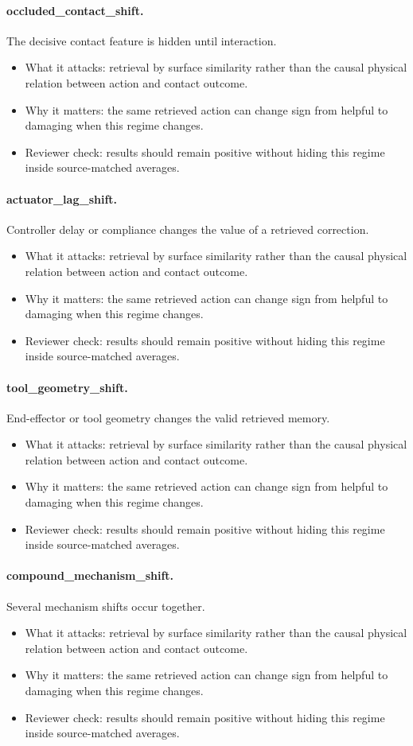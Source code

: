 \documentclass{article}
\begin{document}
\paragraph{occluded\_contact\_shift.} The decisive contact feature is hidden until interaction.
\begin{itemize}
\item What it attacks: retrieval by surface similarity rather than the causal physical relation between action and contact outcome.
\item Why it matters: the same retrieved action can change sign from helpful to damaging when this regime changes.
\item Reviewer check: results should remain positive without hiding this regime inside source-matched averages.
\end{itemize}
\paragraph{actuator\_lag\_shift.} Controller delay or compliance changes the value of a retrieved correction.
\begin{itemize}
\item What it attacks: retrieval by surface similarity rather than the causal physical relation between action and contact outcome.
\item Why it matters: the same retrieved action can change sign from helpful to damaging when this regime changes.
\item Reviewer check: results should remain positive without hiding this regime inside source-matched averages.
\end{itemize}
\paragraph{tool\_geometry\_shift.} End-effector or tool geometry changes the valid retrieved memory.
\begin{itemize}
\item What it attacks: retrieval by surface similarity rather than the causal physical relation between action and contact outcome.
\item Why it matters: the same retrieved action can change sign from helpful to damaging when this regime changes.
\item Reviewer check: results should remain positive without hiding this regime inside source-matched averages.
\end{itemize}
\paragraph{compound\_mechanism\_shift.} Several mechanism shifts occur together.
\begin{itemize}
\item What it attacks: retrieval by surface similarity rather than the causal physical relation between action and contact outcome.
\item Why it matters: the same retrieved action can change sign from helpful to damaging when this regime changes.
\item Reviewer check: results should remain positive without hiding this regime inside source-matched averages.
\end{itemize}
\clearpage
\end{document}
